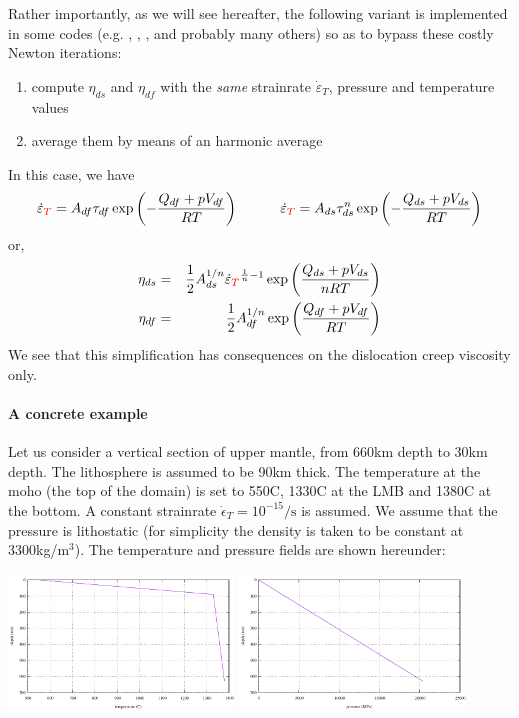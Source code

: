 \begin{itemize}
Rather importantly, as we will see hereafter, the following variant is implemented 
in some codes (e.g. \douar, \fantom, \sopale, and probably many others) 
so as to bypass these costly Newton iterations:
\begin{enumerate}
\item compute $\eta_{ds}$ and $\eta_{df}$ with the {\it same} strainrate $\dot\varepsilon_T$, 
pressure and temperature values
\item average them by means of an harmonic average
\end{enumerate}
In this case, we have
\[
\dot{\varepsilon}_{\color{red} T}= 
A_{df} \tau_{df} \exp\left(-\frac{Q_{df}+pV_{df}}{RT}\right)
\quad\quad\quad
\dot{\varepsilon}_{\color{red} T}= 
A_{ds} \tau_{ds}^n \exp\left(-\frac{Q_{ds}+pV_{ds}}{RT}\right)
\]
or, 
\begin{eqnarray}
\eta_{ds} 
&=& \frac{1}{2} A_{ds}^{1/n} \dot\varepsilon_{\color{red}T}^{\frac{1}{n}-1} \exp \left(\frac{Q_{ds}+pV_{ds}}{nRT}\right) \\
\eta_{df} 
&=& \frac{1}{2} A_{df}^{1/n}  \exp \left(\frac{Q_{df}+pV_{df}}{RT}\right) 
\end{eqnarray}
We see that this simplification has consequences on the dislocation creep viscosity only.


\paragraph{A concrete example}
Let us consider a vertical section of upper mantle, from 660\si{\km} depth to 30\si{\km} depth.
The lithosphere is assumed to be 90\si{\km} thick. The temperature at the moho (the top
of the domain) is set to 550C, 1330C at the LMB and 1380C at the bottom.
A constant strainrate $\dot{\epsilon}_T=10^{-15}\si{\per\second}$ is assumed. 
We assume that the pressure is lithostatic (for simplicity 
the density is taken to be constant at 3300kg/m$^3$).
The temperature and pressure fields are shown hereunder:
\begin{center}
\includegraphics[width=6cm]{images/rheology/effvisc/temperature.pdf}
\includegraphics[width=6cm]{images/rheology/effvisc/pressure.pdf}
\end{center}


\end{itemize}
